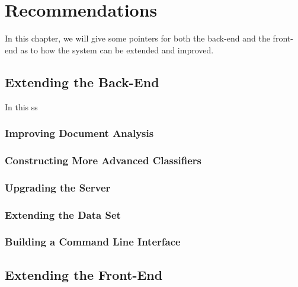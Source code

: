 \chapter{Recommendations}
In this chapter, we will give some pointers for both the back-end and the front-end as to how the system can be extended and improved.

 
\section{Extending the Back-End}
In this ss
\subsection{Improving Document Analysis}

\subsection{Constructing More Advanced Classifiers}
\subsection{Upgrading the Server}
\subsection{Extending the Data Set}
\subsection{Building a Command Line Interface}
\section{Extending the Front-End}